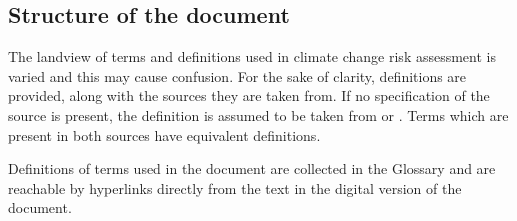 \subsection{Structure of the document}
The landview of terms and definitions used in climate change risk assessment is varied and this may cause confusion. For the sake of clarity, definitions are provided, along with the sources they are taken from.
If no specification of the source is present, the definition is assumed to be taken from \cite{2021ISO14091} or \cite{2021MatthewsAnnexVII}. Terms which are present in both sources have equivalent definitions.

Definitions of terms used in the document are collected in the Glossary and are reachable by hyperlinks directly from the text in the digital version of the document.
